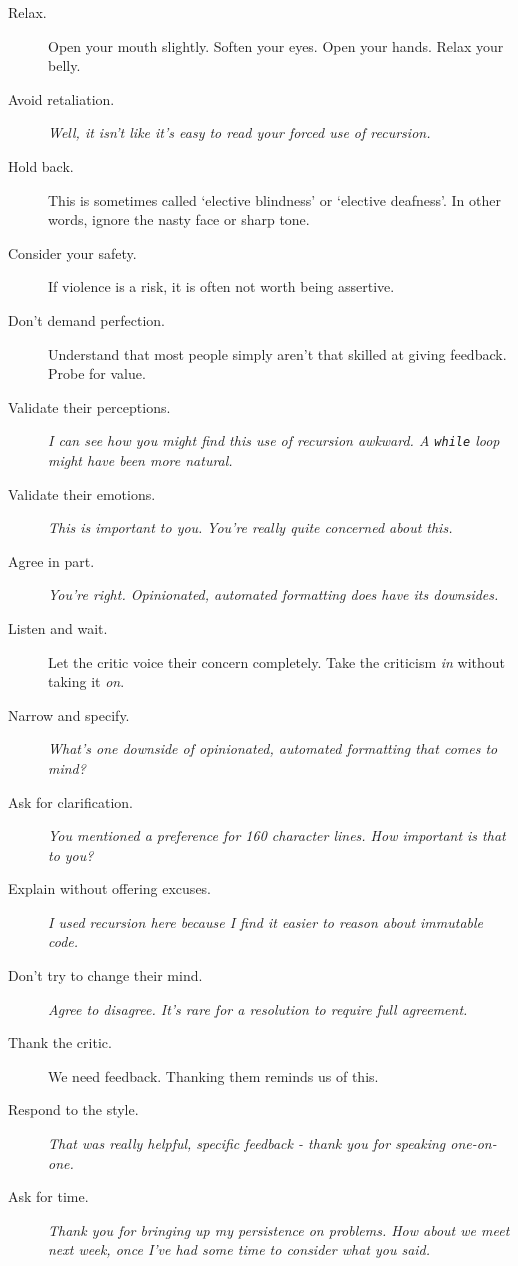 \documentclass{article}
\begin{document}
\begin{tiny}
\begin{multicols}{3}
\begin{tcolorbox}[breakable,colback=rainbow3]
        \begin{description}
            \item[Relax.] Open your mouth slightly. Soften your eyes. Open your hands. Relax your belly.
            \item[Avoid retaliation.] \emph {Well, it isn't like it's easy to read your forced use of recursion.}
            \item[Hold back.] This is sometimes called `elective blindness' or `elective deafness'. In other words, ignore the nasty face or sharp tone.
            \item[Consider your safety.] If violence is a risk, it is often not worth being assertive.
            \item[Don't demand perfection.] Understand that most people simply aren't that skilled at giving feedback. Probe for value.
            \item[Validate their perceptions.] \emph{I can see how you might find this use of recursion awkward. A \texttt{while} loop might have been more natural.}
            \item[Validate their emotions.] \emph{This is important to you.} \emph{You're really quite concerned about this.}
            \item[Agree in part.] \emph{You're right. Opinionated, automated formatting does have its downsides.}
            \item[Listen and wait.] Let the critic voice their concern completely. Take the criticism \emph{in} without taking it \emph{on}.
            \item[Narrow and specify.] \emph{What's one downside of opinionated, automated formatting that comes to mind?}
            \item[Ask for clarification.] \emph{You mentioned a preference for 160 character lines. How important is that to you?}
            \item[Explain without offering excuses.] \emph{I used recursion here because I find it easier to reason about immutable code.}
            \item[Don't try to change their mind.] \emph{Agree to disagree. It's rare for a resolution to require full agreement.}
            \item[Thank the critic.] We need feedback. Thanking them reminds us of this.
            \item[Respond to the style.] \emph{That was really helpful, specific feedback - thank you for speaking one-on-one.}
            \item[Ask for time.] \emph{Thank you for bringing up my persistence on problems. How about we meet next week, once I've had some time to consider what you said.}

\end{description}
\end{tcolorbox}
\end{multicols}
\end{tiny}
\end{document}
